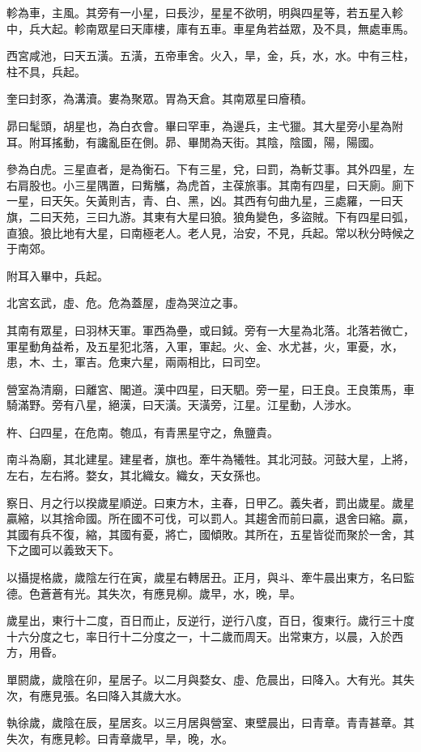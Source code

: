 軫為車，主風。其旁有一小星，曰長沙，星星不欲明，明與四星等，若五星入軫中，兵大起。軫南眾星曰天庫樓，庫有五車。車星角若益眾，及不具，無處車馬。

西宮咸池，曰天五潢。五潢，五帝車舍。火入，旱，金，兵，水，水。中有三柱，柱不具，兵起。

奎曰封豕，為溝瀆。婁為聚眾。胃為天倉。其南眾星曰廥積。

昴曰髦頭，胡星也，為白衣會。畢曰罕車，為邊兵，主弋獵。其大星旁小星為附耳。附耳搖動，有讒亂臣在側。昴、畢閒為天街。其陰，陰國，陽，陽國。

參為白虎。三星直者，是為衡石。下有三星，兌，曰罰，為斬艾事。其外四星，左右肩股也。小三星隅置，曰觜觿，為虎首，主葆旅事。其南有四星，曰天廁。廁下一星，曰天矢。矢黃則吉，青、白、黑，凶。其西有句曲九星，三處羅，一曰天旗，二曰天苑，三曰九游。其東有大星曰狼。狼角變色，多盜賊。下有四星曰弧，直狼。狼比地有大星，曰南極老人。老人見，治安，不見，兵起。常以秋分時候之于南郊。

附耳入畢中，兵起。

北宮玄武，虛、危。危為蓋屋，虛為哭泣之事。

其南有眾星，曰羽林天軍。軍西為壘，或曰鉞。旁有一大星為北落。北落若微亡，軍星動角益希，及五星犯北落，入軍，軍起。火、金、水尤甚，火，軍憂，水，患，木、土，軍吉。危東六星，兩兩相比，曰司空。

營室為清廟，曰離宮、閣道。漢中四星，曰天駟。旁一星，曰王良。王良策馬，車騎滿野。旁有八星，絕漢，曰天潢。天潢旁，江星。江星動，人涉水。

杵、臼四星，在危南。匏瓜，有青黑星守之，魚鹽貴。

南斗為廟，其北建星。建星者，旗也。牽牛為犧牲。其北河鼓。河鼓大星，上將，左右，左右將。婺女，其北織女。織女，天女孫也。

察日、月之行以揆歲星順逆。曰東方木，主春，日甲乙。義失者，罰出歲星。歲星贏縮，以其捨命國。所在國不可伐，可以罰人。其趨舍而前曰贏，退舍曰縮。贏，其國有兵不復，縮，其國有憂，將亡，國傾敗。其所在，五星皆從而聚於一舍，其下之國可以義致天下。

以攝提格歲，歲陰左行在寅，歲星右轉居丑。正月，與斗、牽牛晨出東方，名曰監德。色蒼蒼有光。其失次，有應見柳。歲早，水，晚，旱。

歲星出，東行十二度，百日而止，反逆行，逆行八度，百日，復東行。歲行三十度十六分度之七，率日行十二分度之一，十二歲而周天。出常東方，以晨，入於西方，用昏。

單閼歲，歲陰在卯，星居子。以二月與婺女、虛、危晨出，曰降入。大有光。其失次，有應見張。名曰降入其歲大水。

執徐歲，歲陰在辰，星居亥。以三月居與營室、東壁晨出，曰青章。青青甚章。其失次，有應見軫。曰青章歲早，旱，晚，水。

